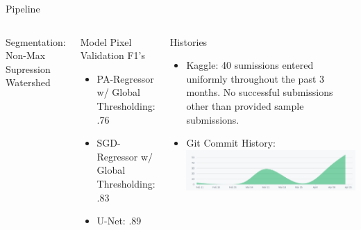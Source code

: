 \documentclass[final]{beamer}
\newlength{\restofpage}
\begin{document}
\begin{frame}[t]
\begin{columns}[t]
\begin{column}{\restofpage}
\begin{block}{Pipeline}
\begin{tikzpicture}
        \end{tikzpicture}
    \end{block}

    \begin{columns}[c]

        \begin{block}{Segmentation: \newline Non-Max Supression Watershed} \end{block}
        \begin{block}{Model Pixel Validation F1's}
          \begin{itemize}
            \item PA-Regressor w/ Global Thresholding: .76
            \item SGD-Regressor w/ Global Thresholding: .83
            \item U-Net: .89
          \end{itemize}
        \end{block}
        \begin{block}{Histories}
          \begin{itemize}
            \item Kaggle: 40 sumissions entered uniformly throughout the past
            3 months. No successful submissions other than provided sample submissions.
            \item Git Commit History: \newline
              \includegraphics[width=\textwidth]{./figs/commit_graph.png}
          \end{itemize}
        \end{block}

    \end{columns}

\end{column}

\end{columns}

\end{frame}
\end{document}
